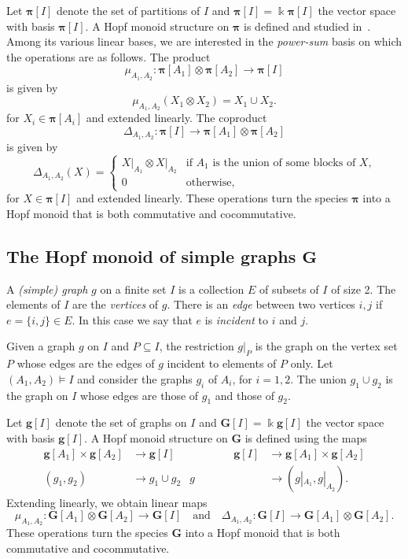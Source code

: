 \documentclass[ALCO,ThmDefs,Unicode,epreuves]{cedram}
\def\field{\Bbbk}
\newcommand{\rG}{\mathbf{g}}
\newcommand{\bPi}{\bpi}
\newcommand{\bG}{\mathbf{G}}
\newcommand{\bpi}{\boldsymbol \pi}
\newcommand{\qand}{\quad\text{and}\quad}
\begin{document}
Let ${\bpi}[I]$ denote the set of partitions of $I$ and $\bPi[I]=\field {\bpi}[I]$ the vector
space with basis ${\bpi}[I]$. 
A Hopf monoid structure on $\bPi$ is defined and studied in~\cite{AguiarBergeronThiem,AM:2010,BakerJarvisBergeronThiem,BergeronZabrocki}. Among its various linear bases, we are interested in the \emph{power-sum} basis 
on which the operations are as follows. 
The product
\[
\mu_{A_1,A_2}: \bPi[A_1] \otimes \bPi[A_2] \to \bPi[I] 
\]
is given by
\begin{equation}\label{e:prod-m}
\mu_{A_1,A_2}({X_1} \otimes {X_2}) = X_1\cup X_2.
\end{equation}
for $X_i\in {\bpi}[A_i]$ and extended linearly. The coproduct
\[
\Delta_{A_1,A_2}: \bPi[I] \to \bPi[A_1]\otimes\bPi[A_2]
\]
is given by
\begin{equation}\label{e:coprod-m}
\Delta_{A_1,A_2}(X) = 
\begin{cases}
{X|_{A_1}} \otimes {X|_{A_2}} & \text{if $A_1$ is the union of some blocks of $X$,} \\
0 & \text{otherwise,}
\end{cases}
\end{equation}
for $X\in {\bpi}[I]$ and extended linearly.
These operations turn the species $\bPi$ into a Hopf monoid that is both commutative and cocommutative.

\subsection{The Hopf monoid of simple graphs \texorpdfstring{$\mathbf{G}$}{G}}\label{ss:graph}

A \emph{(simple) graph} $g$ on a finite set $I$ is a collection $E$ of subsets of $I$ of size 2.
The elements of $I$ are the \emph{vertices} of $g$.
There is an \emph{edge} between two vertices $i, j$ if $e=\{i,j\}\in E$. In this case we say that $e$ is \emph{incident} to $i$ and $j$.


 Given a graph $g$ on $I$ and $P\subseteq I$, the restriction
$g|_P$ is the graph on the vertex set $P$ whose edges are the edges of $g$ incident to elements of $P$ only.
Let $(A_1, A_2)\models I$ and
consider the graphs $g_i$ of $A_i$, for $i=1,2$.
The union $g_1\cup g_2$ is the graph on $I$ 
whose edges are those of $g_1$ and those of $g_2$.

Let $\rG[I]$ denote the set of graphs on $I$ and $\bG[I]=\field \rG[I]$ the vector
space with basis $\rG[I]$. 
A Hopf monoid structure on $\bG$ is defined using the maps
\begin{equation}\label{e:G}
\begin{aligned}
\rG[A_1]\times\rG[A_2] & \to \rG[I] &\qquad\qquad \rG[I] & \to \rG[A_1]\times\rG[A_2]\\
(g_1,g_2) & \to g_1\cup g_2
& g & \to (g |_{A_1},g |_{A_2}).
\end{aligned}
\end{equation}
Extending linearly, we obtain linear maps
\[
 \mu_{A_1,A_2}:\bG[A_1]\otimes\bG[A_2] \to \bG[I]
 \qand
\Delta_{A_1,A_2}:\bG[I]\to \bG[A_1]\otimes\bG[A_2].
\]
These operations turn the species $\bG$ into a Hopf monoid that is both commutative and cocommutative.
\end{document}
